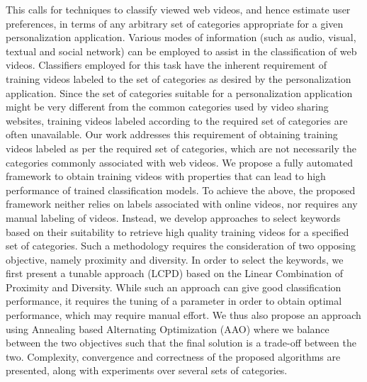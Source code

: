 This calls for techniques to classify viewed web videos, and hence estimate user preferences, in terms of any arbitrary set of categories appropriate for a given personalization application. Various modes of information (such as audio, visual, textual and social network) can be employed to assist in the classification of web videos. Classifiers employed for this task have the inherent requirement of training videos labeled to the set of categories as desired by the personalization application. Since the set of categories suitable for a personalization application might be very different from the common categories used by video sharing websites, training videos labeled according to the required set of categories are often unavailable. Our work addresses this requirement of obtaining training videos labeled as per the required set of categories, which are not necessarily the categories commonly associated with web videos. We propose a fully automated framework to obtain training videos with properties that can lead to high performance of trained classification models. To achieve the above, the proposed framework neither relies on labels associated with online videos, nor requires any manual labeling of videos. Instead, we develop approaches to select keywords based on their suitability to retrieve high quality training videos for a specified set of categories. Such a methodology requires the consideration of two opposing objective, namely proximity and diversity. In order to select the keywords, we first present a tunable approach  (LCPD) based on the Linear Combination of Proximity and Diversity. While such an approach can give good classification performance, it requires the tuning of a parameter in order to obtain optimal performance, which may require manual effort. We thus also propose an approach using Annealing based Alternating Optimization (AAO) where we balance between the two objectives such that the final solution is a trade-off between the two. Complexity, convergence and correctness of the proposed algorithms are presented, along with experiments over several sets of categories. 
